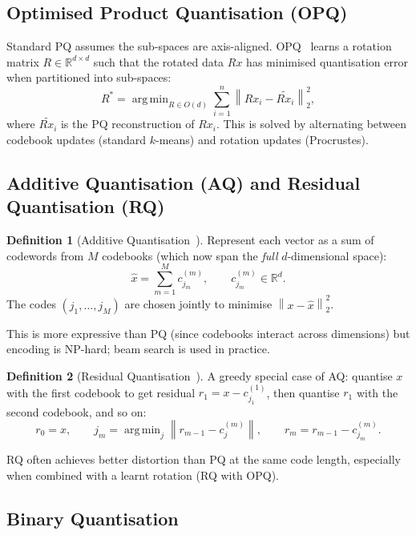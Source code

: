 \documentclass[11pt,a4paper]{article}
\theoremstyle{definition}
\newtheorem{definition}{Definition}[section]
\newcommand{\R}{\mathbb{R}}
\newcommand{\norm}[1]{\left\lVert #1 \right\rVert}
\newcommand{\argmin}{\operatorname{arg\,min}}
\begin{document}
\subsection{Optimised Product Quantisation (OPQ)~\cite{ge2013opq}}

Standard PQ assumes the sub-spaces are axis-aligned.  OPQ~\cite{ge2013opq} learns a
rotation matrix $R \in \R^{d \times d}$ such that the rotated data
$Rx$ has minimised quantisation error when partitioned into sub-spaces:
\[
  R^* = \argmin_{R \in O(d)} \sum_{i=1}^n
  \norm{Rx_i - \widetilde{Rx_i}}_2^2,
\]
where $\widetilde{Rx_i}$ is the PQ reconstruction of $Rx_i$.  This is
solved by alternating between codebook updates (standard $k$-means) and
rotation updates (Procrustes).

\subsection{Additive Quantisation (AQ) and Residual Quantisation (RQ)}

\begin{definition}[Additive Quantisation~\cite{babenko2014aq}]
Represent each vector as a sum of codewords from $M$ codebooks (which
now span the \emph{full} $d$-dimensional space):
\[
  \hat{x} = \sum_{m=1}^{M} c^{(m)}_{j_m}, \qquad c^{(m)}_{j_m} \in \R^d.
\]
The codes $(j_1, \ldots, j_M)$ are chosen jointly to minimise
$\norm{x - \hat{x}}_2^2$.
\end{definition}

This is more expressive than PQ (since codebooks interact across
dimensions) but encoding is NP-hard; beam search is used in practice.

\begin{definition}[Residual Quantisation~\cite{chen2010rq}]
A greedy special case of AQ: quantise $x$ with the first codebook to
get residual $r_1 = x - c^{(1)}_{j_1}$, then quantise $r_1$ with the
second codebook, and so on:
\[
  r_0 = x, \qquad j_m = \argmin_j \norm{r_{m-1} - c^{(m)}_j}, \qquad
  r_m = r_{m-1} - c^{(m)}_{j_m}.
\]
\end{definition}

RQ often achieves better distortion than PQ at the same code length,
especially when combined with a learnt rotation (RQ with OPQ).

\subsection{Binary Quantisation}
\end{document}
